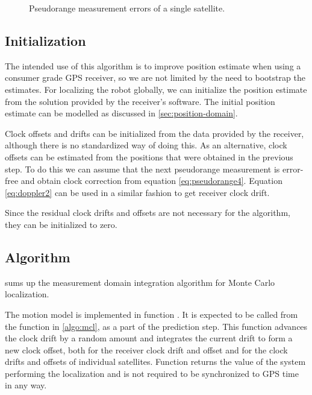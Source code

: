 \begin{figure}[htp]
	\centering
	\caption{Pseudorange measurement errors of a single satellite.}
	\label{fig:pseudorange-errors}
\end{figure}


\subsection{Initialization}
The intended use of this algorithm is to improve position estimate when using
a consumer grade GPS receiver, so we are not limited by the need to bootstrap the estimates.
For localizing the robot globally, we can initialize the position
estimate from the solution provided by the receiver's software.
The initial position estimate can be modelled as discussed in \cref{sec:position-domain}.

Clock offsets and drifts can be initialized from the data provided by the
receiver, although there is no standardized way of doing this.
As an alternative, clock offsets can be estimated from the positions that were obtained in
the previous step.
To do this we can assume that the next pseudorange measurement is error-free
and obtain clock correction from equation \eqref{eq:pseudorange4}.
Equation \eqref{eq:doppler2} can be used in a similar fashion to get receiver clock drift.

Since the residual clock drifts and offsets are not necessary for the algorithm,
they can be initialized to zero.

\subsection{Algorithm}
 sums up the measurement domain integration
algorithm for Monte Carlo localization.

The motion model is implemented in function \predictGPS{}.
It is expected to be called from the function \sampleFromActionModel{} in \cref{algo:mcl},
as a part of the prediction step.
This function advances the clock drift by a random amount
and integrates the current drift to form a new clock offset,
both for the receiver clock drift and offset and for the
clock drifts and offsets of individual satellites.
Function \timeFunc{} returns the value of the system performing the localization
and is not required to be synchronized to GPS time in any way.

